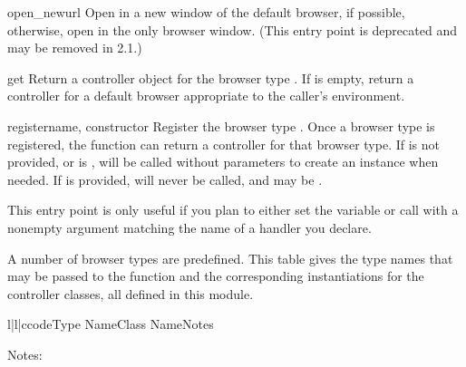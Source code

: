 \begin{funcdesc}{open_new}{url}
  Open  in a new window of the default browser, if possible,
  otherwise, open  in the only browser window.  (This entry
  point is deprecated and may be removed in 2.1.)
\end{funcdesc}

\begin{funcdesc}{get}{}
  Return a controller object for the browser type .  If
   is empty, return a controller for a default browser
  appropriate to the caller's environment.
\end{funcdesc}

\begin{funcdesc}{register}{name, constructor}
  Register the browser type .  Once a browser type is
  registered, the  function can return a controller
  for that browser type.  If  is not provided, or is
  ,  will be called without parameters to
  create an instance when needed.  If  is provided,
   will never be called, and may be .

  This entry point is only useful if you plan to either set the
   variable or call  with a nonempty
  argument matching the name of a handler you declare.  
\end{funcdesc}

A number of browser types are predefined.  This table gives the type
names that may be passed to the  function and the
corresponding instantiations for the controller classes, all defined
in this module.

\begin{tableiii}{l|l|c}{code}{Type Name}{Class Name}{Notes}
\end{tableiii}

\noindent
Notes:

